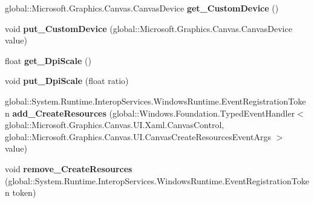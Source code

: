 \begin{DoxyCompactItemize}
global\+::\+Microsoft.\+Graphics.\+Canvas.\+Canvas\+Device {\bfseries get\+\_\+\+Custom\+Device} ()
\item 
\mbox{\label{interface_microsoft_1_1_graphics_1_1_canvas_1_1_u_i_1_1_xaml_1_1_i_canvas_control_a4da1f97d13f825f768730d9598d88902}} 
void {\bfseries put\+\_\+\+Custom\+Device} (global\+::\+Microsoft.\+Graphics.\+Canvas.\+Canvas\+Device value)
\item 
\mbox{\label{interface_microsoft_1_1_graphics_1_1_canvas_1_1_u_i_1_1_xaml_1_1_i_canvas_control_aa82b042e077fa0bf256753af653fd201}} 
float {\bfseries get\+\_\+\+Dpi\+Scale} ()
\item 
\mbox{\label{interface_microsoft_1_1_graphics_1_1_canvas_1_1_u_i_1_1_xaml_1_1_i_canvas_control_a6e1d54ce91aed2c4bb4394e089748342}} 
void {\bfseries put\+\_\+\+Dpi\+Scale} (float ratio)
\item 
\mbox{\label{interface_microsoft_1_1_graphics_1_1_canvas_1_1_u_i_1_1_xaml_1_1_i_canvas_control_a8a6d5efad4792d05ccdb1542d9522d15}} 
global\+::\+System.\+Runtime.\+Interop\+Services.\+Windows\+Runtime.\+Event\+Registration\+Token {\bfseries add\+\_\+\+Create\+Resources} (global\+::\+Windows.\+Foundation.\+Typed\+Event\+Handler$<$ global\+::\+Microsoft.\+Graphics.\+Canvas.\+U\+I.\+Xaml.\+Canvas\+Control, global\+::\+Microsoft.\+Graphics.\+Canvas.\+U\+I.\+Canvas\+Create\+Resources\+Event\+Args $>$ value)
\item 
\mbox{\label{interface_microsoft_1_1_graphics_1_1_canvas_1_1_u_i_1_1_xaml_1_1_i_canvas_control_a48c306eacb3c3028e82658d035cc92b5}} 
void {\bfseries remove\+\_\+\+Create\+Resources} (global\+::\+System.\+Runtime.\+Interop\+Services.\+Windows\+Runtime.\+Event\+Registration\+Token token)
\item 
\mbox{\label{interface_microsoft_1_1_graphics_1_1_canvas_1_1_u_i_1_1_xaml_1_1_i_canvas_control_af948766c9a45fe4b177283cc36deb1ad}} 

\end{DoxyCompactItemize}
